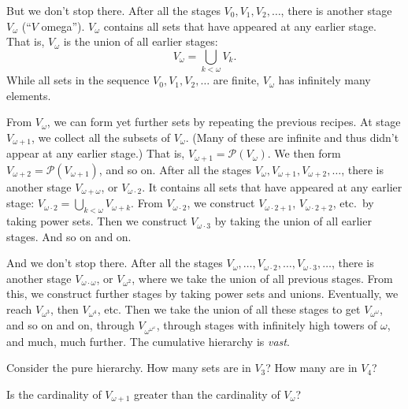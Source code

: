 \begin{figure}
  \centering
  \scalebox{0.65}{
  
  }
\end{figure}

But we don't stop there.
After all the stages $V_0, V_1, V_2, \ldots$,
there is another stage $V_{\omega}$ (``$V$ omega'').
$V_\omega$ contains all sets that have appeared at any earlier stage.
That is,
$V_{\omega}$ is the union of all earlier stages:
\[
  V_{\omega} = \bigcup_{k < \omega} V_{k}.
\]
While all sets in the sequence $V_0,V_1, V_2, \ldots$ are finite,
$V_{\omega}$ has infinitely many elements.

From $V_{\omega}$,
we can form yet further sets by repeating the previous recipes.
At stage $V_{\omega + 1}$,
we collect all the subsets of $V_{\omega}$.
(Many of these are infinite and thus didn't appear at any earlier stage.)
That is,
$V_{\omega + 1} = \mathcal{P}(V_{\omega})$.
We then form $V_{\omega + 2} = \mathcal{P}(V_{\omega + 1})$,
and so on.
After all the stages $V_{\omega}, V_{\omega + 1}, V_{\omega + 2}, \ldots$,
there is another stage $V_{\omega + \omega}$, or $V_{\omega \cdot 2}$.
It contains all sets that have appeared at any earlier stage:
$V_{\omega \cdot 2} = \bigcup_{k < \omega} V_{\omega + k}$.
From $V_{\omega \cdot 2}$,
we construct $V_{\omega \cdot 2 + 1}$, $V_{\omega \cdot 2 + 2}$, etc.\ by taking power sets.
Then we construct $V_{\omega \cdot 3}$ by taking the union of all earlier stages.
And so on and on.

And we don't stop there.
After all the stages $V_{\omega}, \ldots, V_{\omega \cdot 2}, \ldots, V_{\omega \cdot 3}, \ldots$,
there is another stage $V_{\omega\cdot \omega}$, or $V_{\omega^{2}}$,
where we take the union of all previous stages.
From this,
we construct further stages by taking power sets and unions.
Eventually,
we reach $V_{\omega^{3}}$,
then $V_{\omega^{4}}$, etc.
Then we take the union of all these stages to get $V_{\omega^{\omega}}$,
and so on and on,
through $V_{\omega^{\omega^\omega}}$,
through stages with infinitely high towers of $\omega$,
and much, much further.
The cumulative hierarchy is \textit{vast}.

\begin{exercise}
  Consider the pure hierarchy.
  How many sets are in $V_{3}$?
  How many are in $V_4$?
\end{exercise}

\begin{exercise}
  Is the cardinality of $V_{\omega\!+\!1}$ greater than the cardinality of $V_{\omega}$?
\end{exercise}

